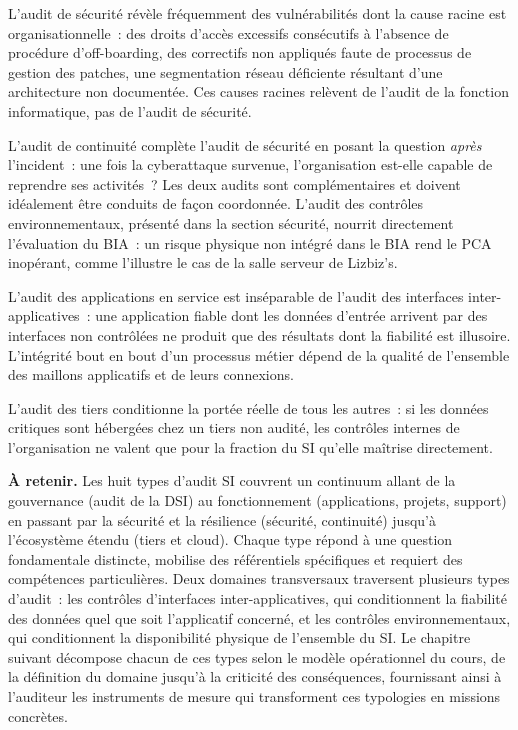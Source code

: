 L'audit de sécurité révèle fréquemment des vulnérabilités dont la cause racine est
organisationnelle~: des droits d'accès excessifs consécutifs à l'absence de procédure
d'off-boarding, des correctifs non appliqués faute de processus de gestion des patches,
une segmentation réseau déficiente résultant d'une architecture non documentée. Ces
causes racines relèvent de l'audit de la fonction informatique, pas de l'audit de
sécurité.

L'audit de continuité complète l'audit de sécurité en posant la question
\textit{après} l'incident~: une fois la cyberattaque survenue, l'organisation est-elle
capable de reprendre ses activités~? Les deux audits sont complémentaires et doivent
idéalement être conduits de façon coordonnée. L'audit des contrôles environnementaux,
présenté dans la section sécurité, nourrit directement l'évaluation du BIA~: un risque
physique non intégré dans le BIA rend le PCA inopérant, comme l'illustre le cas de la
salle serveur de Lizbiz's.

L'audit des applications en service est inséparable de l'audit des interfaces
inter-applicatives~: une application fiable dont les données d'entrée arrivent par des
interfaces non contrôlées ne produit que des résultats dont la fiabilité est illusoire.
L'intégrité bout en bout d'un processus métier dépend de la qualité de l'ensemble des
maillons applicatifs et de leurs connexions.

L'audit des tiers conditionne la portée réelle de tous les autres~: si les données
critiques sont hébergées chez un tiers non audité, les contrôles internes de
l'organisation ne valent que pour la fraction du SI qu'elle maîtrise directement.

\begin{boxresume}
\textbf{À retenir.} Les huit types d'audit SI couvrent un continuum allant de la
gouvernance (audit de la DSI) au fonctionnement (applications, projets, support)
en passant par la sécurité et la résilience (sécurité, continuité) jusqu'à
l'écosystème étendu (tiers et cloud). Chaque type répond à une question fondamentale
distincte, mobilise des référentiels spécifiques et requiert des compétences
particulières. Deux domaines transversaux traversent plusieurs types d'audit~: les
contrôles d'interfaces inter-applicatives, qui conditionnent la fiabilité des données
quel que soit l'applicatif concerné, et les contrôles environnementaux, qui
conditionnent la disponibilité physique de l'ensemble du SI. Le chapitre suivant
décompose chacun de ces types selon le modèle opérationnel du cours, de la définition
du domaine jusqu'à la criticité des conséquences, fournissant ainsi à l'auditeur les
instruments de mesure qui transforment ces typologies en missions concrètes.
\end{boxresume}
